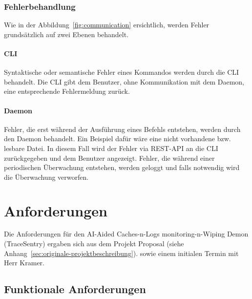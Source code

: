 \documentclass[a4paper,12pt]{report}
\begin{document}
    \subsubsection{Fehlerbehandlung}
    Wie in der Abbildung~\ref{fig:communication} ersichtlich, werden Fehler grundsätzlich auf zwei Ebenen behandelt.

    \paragraph*{CLI}
    Syntaktische oder semantische Fehler eines Kommandos werden durch die CLI behandelt.
    Die CLI gibt dem Benutzer, ohne Kommunikation mit dem Daemon, eine entsprechende Fehlermeldung zurück.

    \paragraph*{Daemon}
    Fehler, die erst während der Ausführung eines Befehls entstehen, werden durch den Daemon behandelt.
    Ein Beispiel dafür wäre eine nicht vorhandene bzw. lesbare Datei.
    In diesem Fall wird der Fehler via REST-API an die CLI zurückgegeben und dem Benutzer angezeigt.
    Fehler, die während einer periodischen Überwachung entstehen, werden geloggt und falls notwendig wird die Überwachung verworfen.

    \clearpage


    \section{Anforderungen}\label{sec:anforderungen}
    Die Anforderungen für den AI-Aided Caches-n-Logs \gls{monitoring}-n-Wiping Demon (TraceSentry) ergaben sich aus dem Projekt Proposal (siehe Anhang~\ref{sec:originale-projektbeschreibung}).
    sowie einem initialen Termin mit Herr Kramer.

    \subsection{Funktionale Anforderungen}\label{subsec:funktionale-anforderungen}
\end{document}
